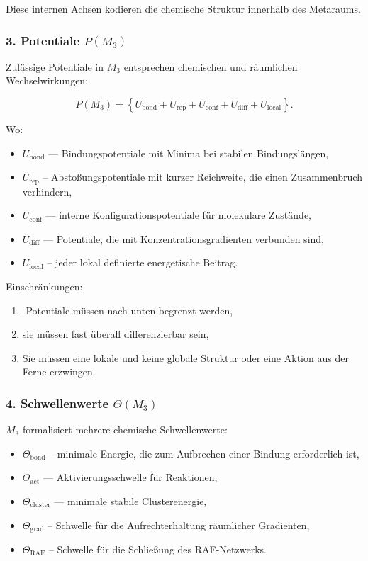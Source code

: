 Diese internen Achsen kodieren die chemische Struktur innerhalb des Metaraums.

\subsubsection*{3. Potentiale \texorpdfstring{$P(M_3)$}{P(M_3)}}

Zulässige Potentiale in $M_3$ entsprechen chemischen und räumlichen Wechselwirkungen:

\[
P(M_3)
=
\left\{
U_{\mathrm{bond}} + U_{\mathrm{rep}} + U_{\mathrm{conf}}
+ U_{\mathrm{diff}} + U_{\mathrm{local}}
\right\}.
\]

Wo:

\begin{itemize}
    \item $U_{\mathrm{bond}}$ — Bindungspotentiale mit Minima bei stabilen Bindungslängen,
    \item $U_{\mathrm{rep}}$ – Abstoßungspotentiale mit kurzer Reichweite, die einen Zusammenbruch verhindern,
    \item $U_{\mathrm{conf}}$ — interne Konfigurationspotentiale für molekulare Zustände,
    \item $U_{\mathrm{diff}}$ — Potentiale, die mit Konzentrationsgradienten verbunden sind,
    \item $U_{\mathrm{local}}$ – jeder lokal definierte energetische Beitrag.
\end{itemize}

Einschränkungen:

\begin{enumerate}
    \item-Potentiale müssen nach unten begrenzt werden,
    \item sie müssen fast überall differenzierbar sein,
    \item Sie müssen eine lokale und keine globale Struktur oder eine Aktion aus der Ferne erzwingen.
\end{enumerate}

\subsubsection*{4. Schwellenwerte \texorpdfstring{$\Theta(M_3)$}{\Theta(M_3)}}

$M_3$ formalisiert mehrere chemische Schwellenwerte:

\begin{itemize}
    \item $\Theta_{\mathrm{bond}}$ – minimale Energie, die zum Aufbrechen einer Bindung erforderlich ist,
    \item $\Theta_{\mathrm{act}}$ — Aktivierungsschwelle für Reaktionen,
    \item $\Theta_{\mathrm{cluster}}$ — minimale stabile Clusterenergie,
    \item $\Theta_{\mathrm{grad}}$ – Schwelle für die Aufrechterhaltung räumlicher Gradienten,
    \item $\Theta_{\mathrm{RAF}}$ – Schwelle für die Schließung des RAF-Netzwerks.
\end{itemize}

